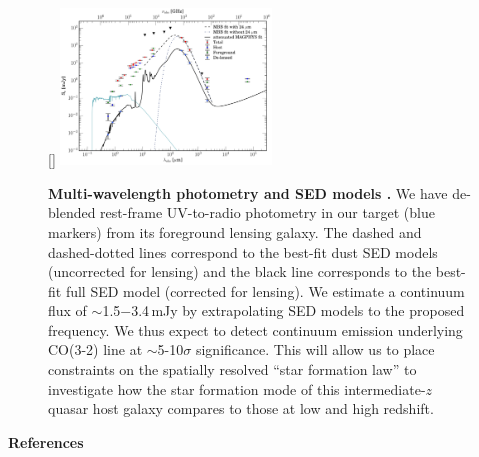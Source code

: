 \documentclass[11pt,a4paper,twoside,graphicx,color]{article}
\newcommand{\cco}{\mbox{CO(3-2)}\xspace}
\newcommand{\ssim}{\,$\sim$\,}
\newcommand{\SF}{star formation\xspace}
\newcommand{\interz}{intermediate-$z$\xspace}
\begin{document}
\begin{figure}[!htbp]
\vspace{-1.15em}
\hspace{-1.95em}
\centering
{}
[\FBwidth]
{
\includegraphics[trim=5 0 13 0, clip, angle=0,
width=0.50\textwidth]{Figures/FullSED_withMagphys}}
{
\hspace{-0.95em}
\caption{
\textbf{Multi-wavelength photometry and SED models
\citep{Leung16b}.}
We have de-blended rest-frame UV-to-radio
photometry in our target
(blue markers) from its foreground lensing galaxy.
The dashed and dashed-dotted lines correspond to the best-fit dust
SED models (uncorrected for lensing)
and
the black line corresponds to the best-fit full SED model (corrected for lensing).
We estimate a continuum flux of
$\sim$1.5$-$3.4\,mJy
by extrapolating SED models to the proposed frequency.
We thus expect to detect continuum emission underlying \cco line at $\sim$5-10$\sigma$ significance.
This will allow us to place constraints on the spatially resolved
``\SF law'' to investigate how the \SF mode of this \interz quasar host galaxy compares
to those at low and high redshift.
\label{fig:SED}}}
\vspace{-0.85em}
\end{figure}

\noindent \textbf{References}
{\fontsize{11pt}{11pt}\selectfont
	
}
\end{document}
